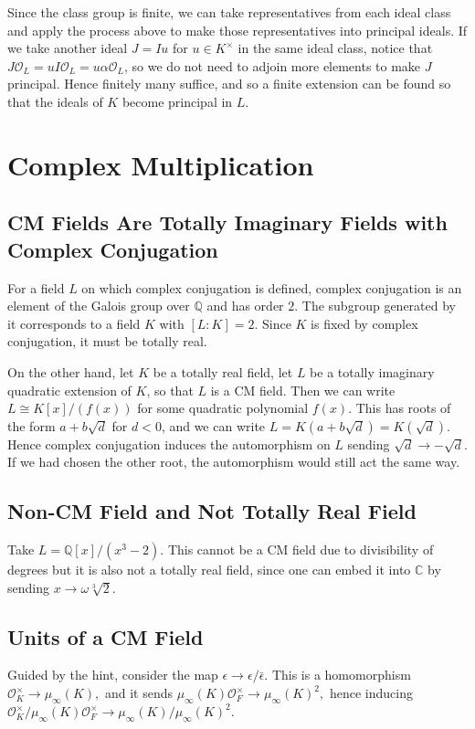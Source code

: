 \documentclass[11pt]{amsart}
\theoremstyle{named}
\newcommand{\roi}[1]{\mathcal{O}_{#1}}
\newcommand{\rats}{\mathbb{Q}}
\begin{document}
Since the class group is finite, we can take representatives from each ideal class and apply the process above to make those representatives into principal ideals. If we take another ideal $J = I u$ for $u \in K^\times$ in the same ideal class, notice that $J \mathcal{O}_L = u I \mathcal{O}_L = u \alpha \mathcal{O}_L$, so we do not need to adjoin more elements to make $J$ principal. Hence finitely many suffice, and so a finite extension can be found so that the ideals of $K$ become principal in $L$.

\section{Complex Multiplication}
\subsection{CM Fields Are Totally Imaginary Fields with Complex Conjugation} For a field $L$ on which complex conjugation is defined, complex conjugation is an element of the Galois group over $\rats$ and has order $2$. The subgroup generated by it corresponds to a field $K$ with $[L : K] = 2$. Since $K$ is fixed by complex conjugation, it must be totally real.

On the other hand, let $K$ be a totally real field, let $L$ be a totally imaginary quadratic extension of $K$, so that $L$ is a CM field. Then we can write $L \cong K[x]/(f(x))$ for some quadratic polynomial $f(x)$. This has roots of the form $a + b\sqrt{d}$ for $d < 0$, and we can write $L = K(a + b \sqrt{d}) = K(\sqrt{d}).$ Hence complex conjugation induces the automorphism on $L$ sending $\sqrt{d} \rightarrow -\sqrt{d}.$ If we had chosen the other root, the automorphism would still act the same way.

\subsection{Non-CM Field and Not Totally Real Field} Take $L = \mathbb{Q}[x]/(x^3 - 2)$. This cannot be a CM field due to divisibility of degrees but it is also not a totally real field, since one can embed it into $\mathbb{C}$ by sending $x \rightarrow \omega \sqrt[3]{2}.$

\subsection{Units of a CM Field} Guided by the hint, consider the map $\epsilon \rightarrow \epsilon/\bar{\epsilon}.$ This is a homomorphism $\roi K^\times \rightarrow \mu_\infty(K),$ and it sends $\mu_\infty(K) \roi F^\times \rightarrow \mu_\infty(K)^2,$ hence inducing $\roi K^\times/\mu_\infty(K)\roi F^\times \rightarrow \mu_\infty(K)/\mu_\infty(K)^2.$
\end{document}
